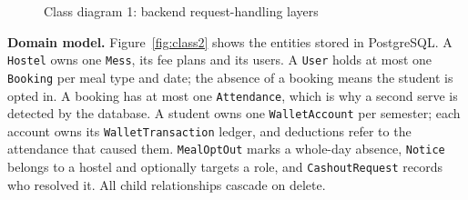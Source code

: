 \documentclass[11pt,a4paper]{article}
\begin{document}
\begin{figure}[H]
{}
\caption{Class diagram 1: backend request-handling layers}
\label{fig:class1}
\end{figure}

\textbf{Domain model.} Figure~\ref{fig:class2} shows the entities stored in
PostgreSQL. A \texttt{Hostel} owns one \texttt{Mess}, its fee plans and its
users. A \texttt{User} holds at most one \texttt{Booking} per meal type and date;
the absence of a booking means the student is opted in. A booking has at most
one \texttt{Attendance}, which is why a second serve is detected by the database.
A student owns one \texttt{WalletAccount} per semester; each account owns its
\texttt{WalletTransaction} ledger, and deductions refer to the attendance that
caused them. \texttt{MealOptOut} marks a whole-day absence, \texttt{Notice}
belongs to a hostel and optionally targets a role, and \texttt{CashoutRequest}
records who resolved it. All child relationships cascade on delete.
\end{document}

